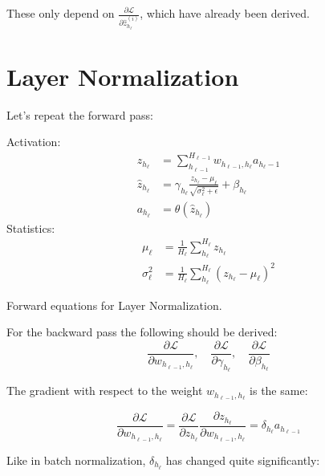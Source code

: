 These only depend on $\frac{\partial \mathcal{L}}{\partial \hat{z}_{h_\ell}^{(i)}}$, which have already been derived.

\clearpage
\section{Layer Normalization}

Let's repeat the forward pass:
\begin{equationbox}[H]
Activation:
\begin{equation*}
\begin{aligned}
z_{h_\ell} &= \sum_{h_{\ell-1}}^{H_{\ell-1}} w_{h_{\ell-1},h_\ell} a_{h_\ell-1} \\
\hat{z}_{h_\ell} &= \gamma_{h_\ell} \frac{z_{h_\ell} - \mu_{\ell}}{\sqrt{\sigma_{\ell}^2 + \epsilon}} + \beta_{h_\ell} \\
a_{h_\ell} &= \theta\left(\hat{z}_{h_\ell}\right)
\end{aligned}
\end{equation*}
Statistics:
\begin{equation*}
\begin{aligned}
\mu_{\ell} &= \frac{1}{H_\ell} \sum_{h_\ell}^{H_\ell} z_{h_\ell} \\
\sigma_{\ell}^2 &= \frac{1}{H_\ell} \sum_{h_\ell}^{H_\ell} (z_{h_\ell} - \mu_{\ell})^2
\end{aligned}
\end{equation*}
\caption{Forward equations for Layer Normalization.}
\end{equationbox}

For the backward pass the following should be derived:
\begin{equation}
\frac{\partial \mathcal{L}}{\partial w_{h_{\ell-1},h_\ell}},\quad \frac{\partial \mathcal{L}}{\partial \gamma_{h_\ell}},\quad \frac{\partial \mathcal{L}}{\partial \beta_{h_\ell}}
\end{equation}

The gradient with respect to the weight $w_{h_{\ell-1},h_\ell}$ is the same:

\begin{equation}
\frac{\partial \mathcal{L}}{\partial w_{h_{\ell-1},h_\ell}} = \frac{\partial \mathcal{L}}{\partial z_{h_\ell}} \frac{\partial z_{h_\ell}}{\partial w_{h_{\ell-1},h_\ell}} = \delta_{h_\ell} a_{h_{\ell-1}}
\end{equation}

Like in batch normalization, $\delta_{h_\ell}$ has changed quite significantly:

